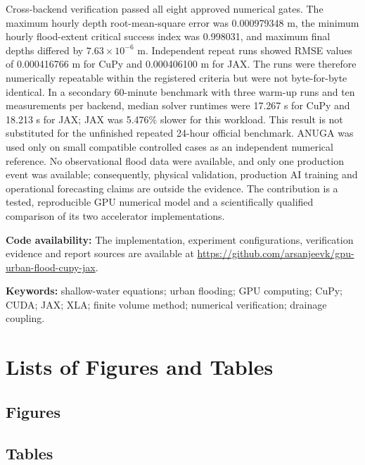 \documentclass[11pt,a4paper,oneside]{report}
\begin{document}
Cross-backend verification passed all eight approved numerical gates. The maximum hourly
depth root-mean-square error was 0.000979348 m, the minimum hourly flood-extent critical
success index was 0.998031, and maximum final depths differed by $7.63\times10^{-6}$ m.
Independent repeat runs showed RMSE values of 0.000416766 m for CuPy and 0.000406100 m
for JAX. The runs were therefore numerically repeatable within the registered criteria but
were not byte-for-byte identical. In a secondary 60-minute benchmark with three warm-up runs
and ten measurements per backend, median solver runtimes were 17.267 s for CuPy and 18.213 s
for JAX; JAX was 5.476\% slower for this workload. This result is not substituted for the
unfinished repeated 24-hour official benchmark. ANUGA was used only on small compatible
controlled cases as an independent numerical reference. No observational flood data were
available, and only one production event was available; consequently, physical validation,
production AI training and operational forecasting claims are outside the evidence. The
contribution is a tested, reproducible GPU numerical model and a scientifically qualified
comparison of its two accelerator implementations.

\medskip
\noindent\textbf{Code availability:} The implementation, experiment configurations,
verification evidence and report sources are available at
\url{https://github.com/arsanjeevk/gpu-urban-flood-cupy-jax}.

\noindent\textbf{Keywords:} shallow-water equations; urban flooding; GPU computing;
CuPy; CUDA; JAX; XLA; finite volume method; numerical verification; drainage coupling.
\clearpage

\tableofcontents
\clearpage
\chapter*{Lists of Figures and Tables}
\section*{Figures}
\makeatletter{}\makeatother
\vspace{5mm}
\section*{Tables}
\makeatletter{}\makeatother
\clearpage
\end{document}
